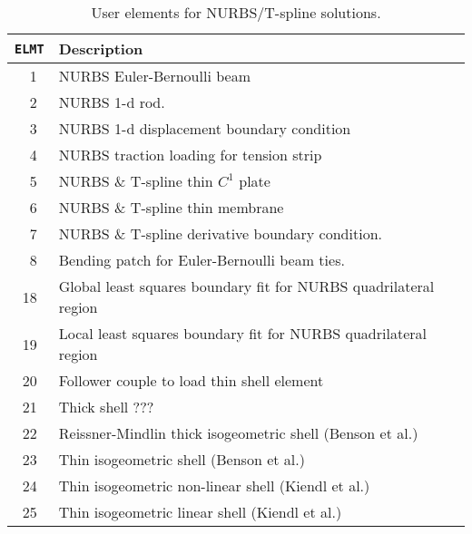 \begin{table}[t]
\begin{center}
\begin{tabular}{| r | p{11cm}|} \hline
\texttt{ELMT} & Description \\ \hline
 1~ & NURBS Euler-Bernoulli beam \\
 2~ & NURBS 1-d rod. \\
 3~ & NURBS 1-d displacement boundary condition \\ 
 4~ & NURBS traction loading for tension strip \\
 5~ & NURBS \& T-spline thin $C^1$ plate \\
 6~ & NURBS \& T-spline thin membrane \\
 7~ & NURBS \& T-spline derivative boundary condition. \\
 8~ & Bending patch for Euler-Bernoulli beam ties. \\
18~ & Global least squares boundary fit for NURBS quadrilateral region \\
19~ & Local least squares boundary fit for NURBS quadrilateral region \\
20~ & Follower couple to load thin shell element \\
21~ & Thick shell ??? \\
22~ & Reissner-Mindlin thick  isogeometric shell (Benson et al.) \\
23~ & Thin isogeometric shell (Benson et al.) \\
24~ & Thin isogeometric non-linear shell (Kiendl et al.) \\
25~ & Thin isogeometric linear shell (Kiendl et al.) \\ \hline
\end{tabular}
\caption{User elements for NURBS/T-spline solutions. \label{tab2iga} }
\end{center}
\end{table}
